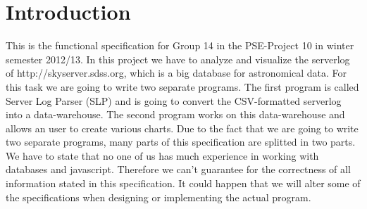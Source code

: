 \section{Introduction}
This is the functional specification for Group 14 in the PSE-Project 10 in winter semester 2012/13. 
In this project we have to analyze and visualize the serverlog of http://skyserver.sdss.org, which is a big database for astronomical 
data. For this task we are going to write two separate programs. The first program is called Server Log Parser (SLP)
and is going to convert the CSV-formatted serverlog into a data-warehouse. The second program works on this data-warehouse
and allows an user to create various charts. Due to the fact that we are going to write two separate programs, many parts
of this specification are splitted in two parts. 
\newline
\newline
We have to state that no one of us has much experience in working with databases and javascript. Therefore we can't guarantee 
for the correctness of all information stated in this specification. It could happen that we will alter some of the specifications
when designing or implementing the actual program.
